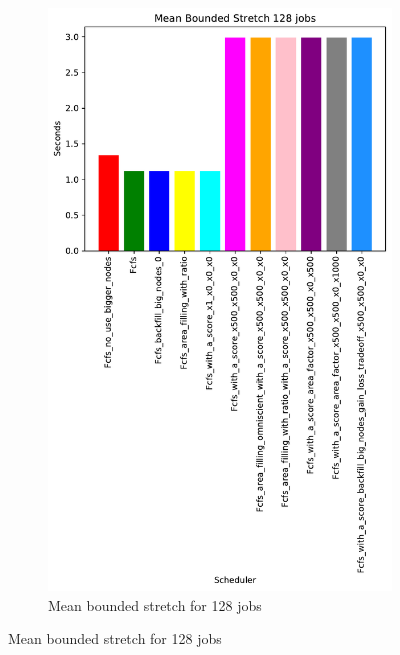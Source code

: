 \documentclass[a4paper]{article}
\begin{document}
\begin{figure}[H]
\begin{subfigure}[b]{0.4\linewidth}\centering\includegraphics[width=0.7\linewidth]{MBSS/plot/Results_Size_And_Data_2022-03-01->2022-03-03_V10000_Mean_Stretch_With_a_Minimum_128_450_128_32_256_4_1024.pdf}\caption{Mean bounded stretch for 128 jobs}\label{45}\end{subfigure}

\end{figure}
\end{document}
